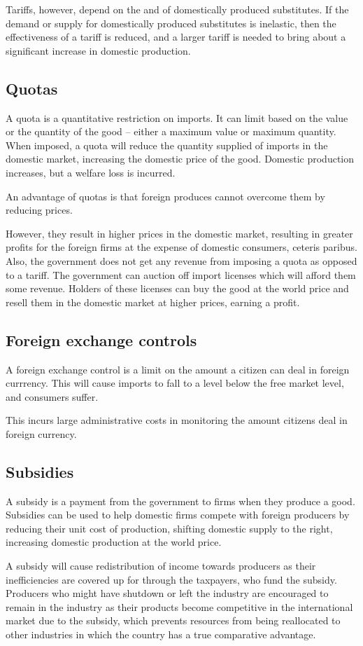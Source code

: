 \documentclass[Economics.tex]{subfiles}
\begin{document}
Tariffs, however, depend on the \PE[D] and \PE[S] of domestically produced substitutes. If the demand or supply for domestically produced substitutes is inelastic, then the effectiveness of a tariff is reduced, and a larger tariff is needed to bring about a significant increase in domestic production.
\subsection{Quotas}
A quota is a quantitative restriction on imports. It can limit based on the value or the quantity of the good -- either a maximum value or maximum quantity. When imposed, a quota will reduce the quantity supplied of imports in the domestic market, increasing the domestic price of the good. Domestic production increases, but a welfare loss is incurred.

An advantage of quotas is that foreign produces cannot overcome them by reducing prices.

However, they result in higher prices in the domestic market, resulting in greater profits for the foreign firms at the expense of domestic consumers, ceteris paribus. Also, the government does not get any revenue from imposing a quota as opposed to a tariff. The government can auction off import licenses which will afford them some revenue. Holders of these licenses can buy the good at the world price and resell them in the domestic market at higher prices, earning a profit.
\subsection{Foreign exchange controls}
A foreign exchange control is a limit on the amount a citizen can deal in foreign currrency. This will cause imports to fall to a level below the free market level, and consumers suffer.

This incurs large administrative costs in monitoring the amount citizens deal in foreign currency.
\subsection{Subsidies}
A subsidy is a payment from the government to firms when they produce a good. Subsidies can be used to help domestic firms compete with foreign producers by reducing their unit cost of production, shifting domestic supply to the right, increasing domestic production at the world price.

A subsidy will cause redistribution of income towards producers as their inefficiencies are covered up for through the taxpayers, who fund the subsidy. Producers who might have shutdown or left the industry are encouraged to remain in the industry as their products become competitive in the international market due to the subsidy, which prevents resources from being reallocated to other industries in which the country has a true comparative advantage.
\end{document}
